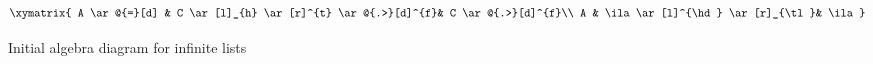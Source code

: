
\begin{figure}[htbp]
\[
\xymatrix{
A \ar@{=}[d] &
    C \ar[l]_{h} \ar[r]^{t} \ar@{.>}[d]^{f}&
    C \ar@{.>}[d]^{f}\\
A &
    \ila \ar[l]^{\hd} \ar[r]_{\tl}&
    \ila
 }
\]
\caption{Initial algebra diagram for infinite lists}\label{fig:inflistalgebra}
\end{figure}
